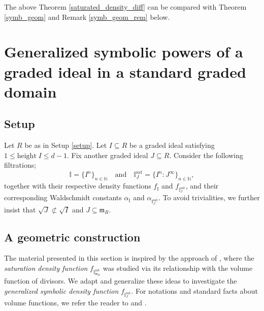 \documentclass[12pt,a4paper]{amsart}
\theoremstyle{plain}
\theoremstyle{definition}
\numberwithin{equation}{theorem}
\begin{document}
The above Theorem \ref{saturated_density_diff} can be compared with Theorem \ref{symb_geom} and Remark \ref{symb_geom_rem} below.

\section{Generalized symbolic powers of a graded ideal in a standard graded domain}\label{section 7}

\subsection{Setup}\label{setup4}
Let $R$ be as in Setup \ref{setup}. Let $I\subseteq R$ be a graded ideal satisfying $1\leq \mathrm{height}\;I\leq d-1$. Fix another graded ideal $J\subseteq R$. Consider the following filtrations; $$\mathbb{I} = \{I^n\}_{n\in\mathbb{N}}\quad \text{and}\quad \mathbb{I}^{\mathrm{sat}}_J = \{I^n \colon J^{\infty}\}_{n\in\mathbb{N}},$$ together with their respective density functions $f_{\mathbb{I}}$ and  $f_{\mathbb{I}^{\mathrm{sat}}_J}$, and their corresponding Waldschmidt constants $\alpha_{\mathbb{I}}$ and $\alpha_{\mathbb{I}^{\mathrm{sat}}_J}$. To avoid trivialities, we further insist that $\sqrt{J} \not\subset \sqrt{I}$ and $J \subseteq \mathfrak{m}_R$.

\subsection{A geometric construction}
The material presented in this section is inspired by the approach of \cite[Section 5]{DRT25}, where the \emph{saturation density function} $f_{\mathbb{I}^{\mathrm{sat}}_{\mathfrak{m}_R}}$ was studied via its relationship with the volume function of divisors. We adapt and generalize these ideas to investigate the \emph{generalized symbolic density function} $f_{\mathbb{I}^{\mathrm{sat}}_J}$. For notations and standard facts about volume functions, we refer the reader to \cite[Chapter 2]{Laz04a} and \cite{LM09}.
\end{document}
